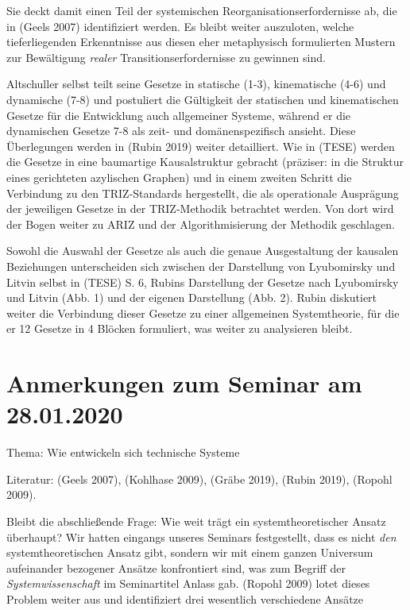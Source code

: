 \documentclass[11pt,a4paper]{article}
\begin{document}
Sie deckt damit einen Teil der systemischen Reorganisationserfordernisse ab,
die in (Geels 2007) identifiziert werden. Es bleibt weiter auszuloten, welche
tieferliegenden Erkenntnisse aus diesen eher metaphysisch formulierten Mustern
zur Bewältigung \emph{realer} Transitionserfordernisse zu gewinnen sind.

Altschuller selbst teilt seine Gesetze in statische (1-3), kinematische (4-6)
und dynamische (7-8) und postuliert die Gültigkeit der statischen und
kinematischen Gesetze für die Entwicklung auch allgemeiner Systeme, während er
die dynamischen Gesetze 7-8 als zeit- und domänenspezifisch ansieht. Diese
Überlegungen werden in (Rubin 2019) weiter detailliert.  Wie in (TESE) werden
die Gesetze in eine baumartige Kausalstruktur gebracht (präziser: in die
Struktur eines gerichteten azylischen Graphen) und in einem zweiten Schritt
die Verbindung zu den TRIZ-Standards hergestellt, die als operationale
Ausprägung der jeweiligen Gesetze in der TRIZ-Methodik betrachtet werden. Von
dort wird der Bogen weiter zu ARIZ und der Algorithmisierung der Methodik
geschlagen.

Sowohl die Auswahl der Gesetze als auch die genaue Ausgestaltung der kausalen
Beziehungen unterscheiden sich zwischen der Darstellung von Lyubomirsky und
Litvin selbst in (TESE) S. 6, Rubins Darstellung der Gesetze nach Lyubomirsky
und Litvin (Abb. 1) und der eigenen Darstellung (Abb. 2). Rubin diskutiert
weiter die Verbindung dieser Gesetze zu einer allgemeinen Systemtheorie, für
die er 12 Gesetze in 4 Blöcken formuliert, was weiter zu analysieren bleibt.

\section{ Anmerkungen zum Seminar am 28.01.2020}

Thema: Wie entwickeln sich technische Systeme

Literatur: (Geels 2007), (Kohlhase 2009), (Gräbe 2019), (Rubin 2019), (Ropohl
2009).

Bleibt die abschließende Frage: Wie weit trägt ein systemtheoretischer Ansatz
überhaupt? Wir hatten eingangs unseres Seminars festgestellt, dass es nicht
\emph{den} systemtheoretischen Ansatz gibt, sondern wir mit einem ganzen
Universum aufeinander bezogener Ansätze konfrontiert sind, was zum Begriff der
\emph{Systemwissenschaft} im Seminartitel Anlass gab. (Ropohl 2009) lotet
dieses Problem weiter aus und identifiziert drei wesentlich verschiedene
Ansätze
\end{document}
